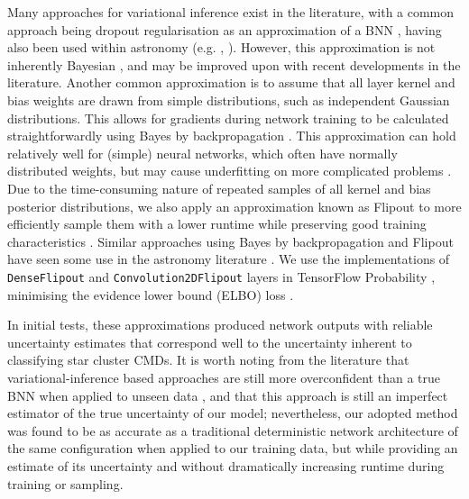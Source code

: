 Many approaches for variational inference exist in the literature, with a common approach being dropout regularisation as an approximation of a BNN \citep{gal_dropout_2015-1}, having also been used within astronomy (e.g. \cite{huertas-company_hubble_2019}, \cite{leung_deep_2019}). However, this approximation is not inherently Bayesian \citep{hron_variational_2017}, and may be improved upon with recent developments in the literature. Another common approximation is to assume that all layer kernel and bias weights are drawn from simple distributions, such as independent Gaussian distributions. This allows for gradients during network training to be calculated straightforwardly using Bayes by backpropagation \citep{blundell_weight_2015}. This approximation can hold relatively well for (simple) neural networks, which often have normally distributed weights, but may cause underfitting on more complicated problems \citep{goan_bayesian_2020}. Due to the time-consuming nature of repeated samples of all kernel and bias posterior distributions, we also apply an approximation known as Flipout to more efficiently sample them with a lower runtime while preserving good training characteristics \citep{wen_flipout_2018}. Similar approaches using Bayes by backpropagation and Flipout have seen some use in the astronomy literature \citep[e.g.][]{lin_detection_2021}. We use the implementations of \texttt{DenseFlipout} and \texttt{Convolution2DFlipout} layers in TensorFlow Probability \citep{dillon_tensorflow_2017}, minimising the evidence lower bound (ELBO) loss \citep{blundell_weight_2015}.

In initial tests, these approximations produced network outputs with reliable uncertainty estimates that correspond well to the uncertainty inherent to classifying star cluster CMDs. It is worth noting from the literature that variational-inference based approaches are still more overconfident than a true BNN when applied to unseen data \citep{goan_bayesian_2020}, and that this approach is still an imperfect estimator of the true uncertainty of our model; nevertheless, our adopted method was found to be as accurate as a traditional deterministic network architecture of the same configuration when applied to our training data, but while providing an estimate of its uncertainty and without dramatically increasing runtime during training or sampling.
